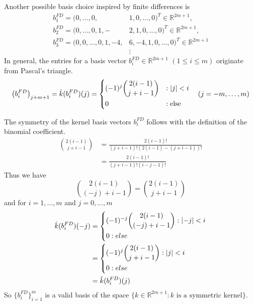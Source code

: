 \documentclass[twoside,a4paper]{article}
\begin{document}
Another possible basis choice inspired by finite differences is
\begin{align*}
	b_1^{FD} = (0, \dots, 0,& 1,0, \dots, 0)^T \in \mathbb{R}^{2m+1},\\
	b_2^{FD} = (0, \dots, 0, 1,-&2,1, 0, \dots, 0)^T \in \mathbb{R}^{2m+1},\\
	b_3^{FD} = (0, 0, \dots, 0, 1,-4,& 6,-4,1, 0, \dots, 0)^T \in \mathbb{R}^{2m+1} \\
	&\vdots
\end{align*}
In general, the entries for a basis vector $b_i^{FD} \in \mathbb{R}^{2m+1}$ $(1 \leq i \leq m)$ 
originate from Pascal's triangle.
\begin{equation*}
	\left( b_i^{FD} \right)_{j+m+1} = \hat{k}(b_i^{FD})(j) = \begin{dcases}
		(-1)^j \binom{2(i-1)}{j+i-1} &: \left|{j}\right| < i \\
		0 &: \text{else}
	\end{dcases}
	\quad (j=-m, \dots, m)
\end{equation*}

The symmetry of the kernel basis vectors $b_i^{FD}$ follows with the definition of the binomial coefficient.
\begin{align*}
	\binom{2(i-1)}{j+i-1} &= \frac{2(i-1)!}{(j+i-1)!(2(i-1)-(j+i-1))!} \\
	&= \frac{2(i-1)!}{(j+i-1)!(i-j-1)!}
\end{align*}
Thus we have
\begin{equation*}
	\binom{2(i-1)}{(-j)+i-1} = \binom{2(i-1)}{j+i-1}
\end{equation*}
and for $i=1, \dots, m$ and $j= 0, \dots, m$
\begin{align*}
	\hat{k}(b_i^{FD})(-j) &= \begin{dcases}
		(-1)^{-j} \binom{2(i-1)}{(-j)+i-1} : \left|{-j}\right| < i \\
		0 : else
	\end{dcases} \\
	&= \begin{dcases}
		(-1)^{j} \binom{2(i-1)}{j+i-1} : \left|{j}\right| < i \\
		0 : else
	\end{dcases} \\
	&= \hat{k}(b_i^{FD})(j) 
\end{align*}
So $\{ b_i^{FD} \}_{i=1}^m$ is a valid basis of
the space $\{ k \in \mathbb{R}^{2m+1} : k \text{ is a symmetric kernel} \}$.
\end{document}
